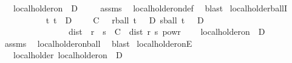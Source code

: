 \begin{isabellebody}
\ \ \ {\isachardoublequoteopen}local{\isacharunderscore}{\kern0pt}holder{\isacharunderscore}{\kern0pt}on\ {\isasymgamma}\ D\ {\isasymphi}{\isachardoublequoteclose}\isanewline
%
\isadelimproof
\ \ %
\endisadelimproof
%
\isatagproof
{}\isamarkupfalse%
\ assms\ \isamarkupfalse%
\ local{\isacharunderscore}{\kern0pt}holder{\isacharunderscore}{\kern0pt}on{\isacharunderscore}{\kern0pt}def\ \isamarkupfalse%
\ blast%
\endisatagproof
{\isafoldproof}%
%
\isadelimproof
\isanewline
%
\endisadelimproof
\isanewline
{}\isamarkupfalse%
\ local{\isacharunderscore}{\kern0pt}holder{\isacharunderscore}{\kern0pt}ballI{\isacharcolon}{\kern0pt}\isanewline
\ \ \ {\isachardoublequoteopen}{\isasymgamma}\ {\isasymin}\ {\isacharbraceleft}{\kern0pt}{}{\isacharless}{\kern0pt}{\isachardot}{\kern0pt}{\isachardot}{\kern0pt}{}{\isacharbraceright}{\kern0pt}{\isachardoublequoteclose}\isanewline
\ \ \ \ \ {\isachardoublequoteopen}{\isasymAnd}t{\isachardot}{\kern0pt}\ t\ {\isasymin}\ D\ {\isasymLongrightarrow}\ {\isasymexists}{\isasymepsilon}\ {\isachargreater}{\kern0pt}\ {}{\isachardot}{\kern0pt}\ {\isasymexists}C\ {\isasymge}\ {}{\isachardot}{\kern0pt}\ {\isasymforall}r{\isasymin}ball\ t\ {\isasymepsilon}\ {\isasyminter}\ D{\isachardot}{\kern0pt}\ {\isasymforall}s{\isasymin}ball\ t\ {\isasymepsilon}\ {\isasyminter}\ D{\isachardot}{\kern0pt}\ \isanewline
\ \ \ \ \ \ \ \ \ \ \ \ \ \ \ \ dist\ {\isacharparenleft}{\kern0pt}{\isasymphi}\ r{\isacharparenright}{\kern0pt}\ {\isacharparenleft}{\kern0pt}{\isasymphi}\ s{\isacharparenright}{\kern0pt}\ {\isasymle}\ C\ {\isacharasterisk}{\kern0pt}\ dist\ r\ s\ powr\ {\isasymgamma}{\isachardoublequoteclose}\isanewline
\ \ \ {\isachardoublequoteopen}local{\isacharunderscore}{\kern0pt}holder{\isacharunderscore}{\kern0pt}on\ {\isasymgamma}\ D\ {\isasymphi}{\isachardoublequoteclose}\isanewline
%
\isadelimproof
\ \ %
\endisadelimproof
%
\isatagproof
{}\isamarkupfalse%
\ assms\ \isamarkupfalse%
\ local{\isacharunderscore}{\kern0pt}holder{\isacharunderscore}{\kern0pt}on{\isacharunderscore}{\kern0pt}ball\ \isamarkupfalse%
\ blast%
\endisatagproof
{\isafoldproof}%
%
\isadelimproof
\isanewline
%
\endisadelimproof
\isanewline
{}\isamarkupfalse%
\ local{\isacharunderscore}{\kern0pt}holder{\isacharunderscore}{\kern0pt}onE{\isacharcolon}{\kern0pt}\isanewline
\ \ \ local{\isacharunderscore}{\kern0pt}holder{\isacharcolon}{\kern0pt}\ {\isachardoublequoteopen}local{\isacharunderscore}{\kern0pt}holder{\isacharunderscore}{\kern0pt}on\ {\isasymgamma}\ D\ {\isasymphi}{\isachardoublequoteclose}\isanewline

\end{isabellebody}
